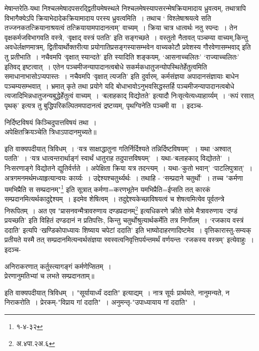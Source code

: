 {{{{मेषान्तरेति-यथा निश्चलमेषादपसरद्द्वितीयमेषस्थले निश्चलमेषस्यापसरन्मेषक्रियामादाय ध्रुवत्वम्, तथात्रापि विभागैक्येऽपि क्रियाभेदादेकक्रियामादाय परस्य ध्रुवत्वमिति~।
तथाच ` विश्लेषाश्रयत्वे सति तज्जनकतत्क्रियानाश्रयत्वं तत्क्रियायामपादानत्वम्' वाच्यम्~।
क्रिया चात्र धात्वर्थः नतु स्पन्दः~।
तेन वृक्षकर्मजविभागवति वस्त्रे, `वृक्षाद् वस्त्रं पतति' इति सङ्गच्छते~।
 वस्तुतो नैतावत् पञ्चम्या वाच्यम्,किन्तु अवधेर्लक्षणमात्रम्, द्वितीयार्थोक्तरीत्या प्रयोगातिप्रसङ्गस्यासम्भवेन वाच्यकोटौ प्रवेशस्य गौरवेणासम्भवाद् इति तु प्रतीभाति~।
नचैवमपि `वृक्षात् स्यान्दते' इति स्यादिति शङ्कयम्, `आसनाच्चलितः' `राज्याच्चलितः' इतिवद् इष्टत्वात्~।
एतेन पञ्चमीजन्यापादानत्वबोधे सकर्मकधातुजन्योपस्थितेर्हेतुत्वमिति समाधानाभासोऽप्यपास्तः~।
 नचैवमपि `वृक्षात् त्यजति' इति दुर्वारम्, कर्मसंज्ञया अपादानसंज्ञायाः बाधेन पञ्चम्यसम्भवात्~।
भ्रमात् कृते तथा प्रयोगे यदि बोधाभावोऽनुभवसिद्धस्तर्हि पञ्चमीजन्यापादानत्वबोधे त्यजादिभिन्नधातुजन्यबुद्धेर्हेतुत्वं वाच्यम्~।
`बलाहकाद् विद्योतते' इत्यादौ निःसृत्येत्यध्याहार्य्यम्~।
`रूपं रसात् पृथक्' इत्यत्र तु 
 बुद्धिपरिकल्पितमपादानत्वं द्रष्टव्यम्, पृथग्विनेति पञ्चमी वा~।
इदञ्च-
\begin{center} निर्दिष्टविषयं किञ्चिदुपात्तविषयं तथा~।\\
 अपेक्षितक्रियञ्चेति त्रिधाऽपादानमुच्यते॥
\end{center}
इति वाक्यपदीयात् त्रिविधम्~।
`यत्र साक्षाद्धातुना गतिर्निर्दिश्यते तन्निर्दिष्टविषयम्'~।
यथा `अश्वात् पतति'~।
`यत्र धात्वन्तरार्थाङ्गं स्वार्थं धातुराह तदुपात्तविषयम्'~।
यथा-`बलाहकाद् विद्योतते'~।
निःसरणाङ्गे विद्योतने द्युतिर्वर्त्तते~।
अपेक्षिता क्रिया यत्र तदन्त्यम्~।
यथा-`कुतो भवान्' `पाटलिपुत्रात्'~।
अत्रगमनमर्थमध्याहृत्यान्वयः कार्य्यः~।
 उद्देश्यश्चतुर्थ्यर्थः~।
तथाहि - `सम्प्रदाने चतुर्थो'~।
तच्च "कर्मणा यमभिप्रैति स सम्प्रदानम्"\footnote{१-४-३२} इति सूत्रात् कर्मणा=करणभूतेन यमभिप्रैति=ईप्सति तत् कारकं सम्प्रदानमित्यर्थकादुद्देश्यम्~।
 इदमेव शेषित्वम्~।
तदुद्देश्यकेच्छाविषयत्वं च शेषत्वमित्येव पूर्वतन्त्रे निरूपितम्~।
अत एव "प्रासनवन्मैत्रावरुणाय दण्डप्रदानम्\footnote{अ.४पा.२अ.६} इत्यधिकरणे क्रीते सोमे मैत्रावरुणाय `दण्डं प्रयच्छति' इति विहितं दण्डदानं न प्रतिपत्तिः, किन्तु चतुर्थोश्रुत्यार्थकर्मेति तत्र निर्णोतम्~।
`रजकाय वस्त्रं ददाति' इत्यपि `खण्डिकोपाध्यायः शिष्याय चपेटां ददाति' इति भाष्योदाहरणादिष्टमेव~।
 वृत्तिकारास्तु-सम्यक् प्रतीयते यस्मै तत् सम्प्रदानमित्यन्वर्थसंज्ञया स्वस्वत्वनिवृत्तिपर्यन्तमर्थं वर्णयन्तः `रजकस्य वस्त्रम्' इत्येवाहुः~।
इदञ्च-
\begin{center}अनिराकरणात् कर्तुस्त्यागङ्गं कर्मणेप्सितम्~।\\
 प्रेरणानुमतिभ्यां च लभते सम्प्रदानताम्॥
\end{center}
 इति वाक्यपदीयात् त्रिविधम्~।
"सूर्यायार्ध्यं ददाति" इत्याद्यम्~।
नात्र सूर्यः प्रार्थयते, नानुमन्यते, न निराकरोति~।
प्रेरकम्-"विप्राय गां ददाति"~।
अनुमन्तृ-"उपाध्यायाय गां ददाति"~।

}}}}

